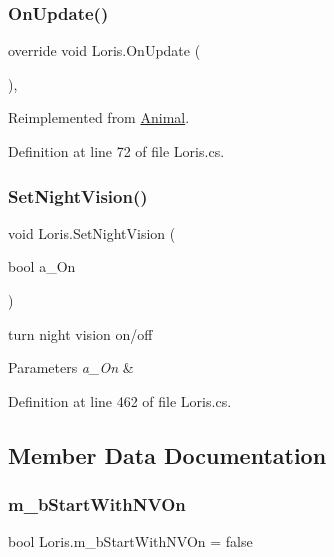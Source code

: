 \subsubsection{\texorpdfstring{On\+Update()}{OnUpdate()}}
{\footnotesize\ttfamily override void Loris.\+On\+Update (\begin{DoxyParamCaption}{ }\end{DoxyParamCaption})\hspace{0.3cm}{\ttfamily [protected]}, {\ttfamily [virtual]}}



Reimplemented from \mbox{\hyperlink{class_animal_a0b0cf85dbc03ad6ed1878e90c2ac84b1}{Animal}}.



Definition at line 72 of file Loris.\+cs.

\mbox{\label{class_loris_a07f351bb7f66abc3ac7dd879997bd510}} 
\subsubsection{\texorpdfstring{Set\+Night\+Vision()}{SetNightVision()}}
{\footnotesize\ttfamily void Loris.\+Set\+Night\+Vision (\begin{DoxyParamCaption}\item[{bool}]{a\+\_\+\+On }\end{DoxyParamCaption})}



turn night vision on/off 


\begin{DoxyParams}{Parameters}
{\em a\+\_\+\+On} & \\
\hline
\end{DoxyParams}


Definition at line 462 of file Loris.\+cs.



\subsection{Member Data Documentation}
\mbox{\label{class_loris_a638ddfa87af7ce10bedad80d2351c288}} 
\subsubsection{\texorpdfstring{m\+\_\+b\+Start\+With\+N\+V\+On}{m\_bStartWithNVOn}}
{\footnotesize\ttfamily bool Loris.\+m\+\_\+b\+Start\+With\+N\+V\+On = false}



